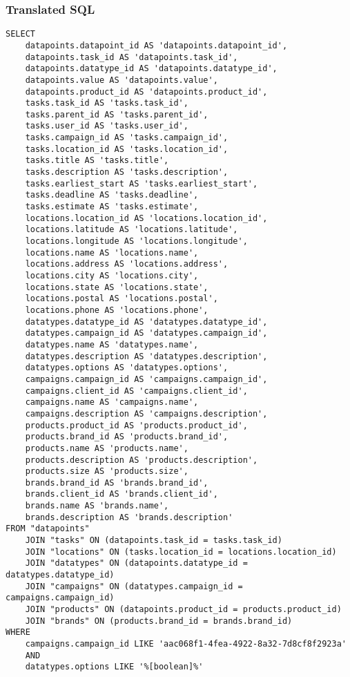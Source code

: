 \documentclass{article}
\begin{document}
\subsubsection{Translated SQL}
\begin{lstlisting}
SELECT
	datapoints.datapoint_id AS 'datapoints.datapoint_id',
	datapoints.task_id AS 'datapoints.task_id',
	datapoints.datatype_id AS 'datapoints.datatype_id',
	datapoints.value AS 'datapoints.value',
	datapoints.product_id AS 'datapoints.product_id',
	tasks.task_id AS 'tasks.task_id',
	tasks.parent_id AS 'tasks.parent_id',
	tasks.user_id AS 'tasks.user_id',
	tasks.campaign_id AS 'tasks.campaign_id',
	tasks.location_id AS 'tasks.location_id',
	tasks.title AS 'tasks.title',
	tasks.description AS 'tasks.description',
	tasks.earliest_start AS 'tasks.earliest_start',
	tasks.deadline AS 'tasks.deadline',
	tasks.estimate AS 'tasks.estimate',
	locations.location_id AS 'locations.location_id',
	locations.latitude AS 'locations.latitude',
	locations.longitude AS 'locations.longitude',
	locations.name AS 'locations.name',
	locations.address AS 'locations.address',
	locations.city AS 'locations.city',
	locations.state AS 'locations.state',
	locations.postal AS 'locations.postal',
	locations.phone AS 'locations.phone',
	datatypes.datatype_id AS 'datatypes.datatype_id',
	datatypes.campaign_id AS 'datatypes.campaign_id',
	datatypes.name AS 'datatypes.name',
	datatypes.description AS 'datatypes.description',
	datatypes.options AS 'datatypes.options',
	campaigns.campaign_id AS 'campaigns.campaign_id',
	campaigns.client_id AS 'campaigns.client_id',
	campaigns.name AS 'campaigns.name',
	campaigns.description AS 'campaigns.description',
	products.product_id AS 'products.product_id',
	products.brand_id AS 'products.brand_id',
	products.name AS 'products.name',
	products.description AS 'products.description',
	products.size AS 'products.size',
	brands.brand_id AS 'brands.brand_id',
	brands.client_id AS 'brands.client_id',
	brands.name AS 'brands.name',
	brands.description AS 'brands.description'
FROM "datapoints"
	JOIN "tasks" ON (datapoints.task_id = tasks.task_id)
	JOIN "locations" ON (tasks.location_id = locations.location_id)
	JOIN "datatypes" ON (datapoints.datatype_id = datatypes.datatype_id)
	JOIN "campaigns" ON (datatypes.campaign_id = campaigns.campaign_id)
	JOIN "products" ON (datapoints.product_id = products.product_id)
	JOIN "brands" ON (products.brand_id = brands.brand_id)
WHERE
	campaigns.campaign_id LIKE 'aac068f1-4fea-4922-8a32-7d8cf8f2923a'
	AND
	datatypes.options LIKE '%[boolean]%'
\end{lstlisting}
\end{document}

